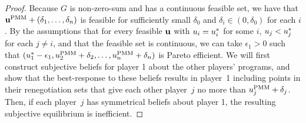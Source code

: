\documentclass[sigconf]{aamas}
\newcommand{\epsdeltaone}{\epsilon_1}
\newcommand{\bestparetopayoffi}{u^*_i}
\newcommand{\bestparetopayoffj}{u^*_j}
\newcommand{\bestparetopayoffone}{u^*_1}
\theoremstyle{definition}
\begin{document}
\begin{proof}
Because $G$ is non-zero-sum 
and has a continuous feasible set, 
we have that $\textbf{u}^{\textnormal{PMM}} + (\delta_1, \dots, \delta_n)$ is
feasible for sufficiently small $\delta_0$ 
and $\delta_i \in (0, \delta_0)$ for each $i$.
By the assumptions that
for every 
feasible $\textbf{u}$ with 
$\payi = \bestparetopayoffi$ for some $i$, 
$\payj < \bestparetopayoffj$ for each 
$j \neq i$, and
that the feasible set is continuous,
we can take $\epsdeltaone > 0$ such that
$(\bestparetopayoffone-\epsdeltaone, \pmmtwo + \delta_2, \dots, \pmmn + \delta_n)$ 
is Pareto efficient.
We will first construct subjective 
beliefs
for player 1
about the other players'
programs, and 
show that the best-response to 
these beliefs results in player~1 including points in their
renegotiation sets that 
give each other player~$j$ no more than 
$u_j^{\textnormal{PMM}} + \delta_j$.
Then, if
each player~$j$ has symmetrical 
beliefs about player 1, 
the resulting subjective 
equilibrium is inefficient.  


\end{proof}
\end{document}
